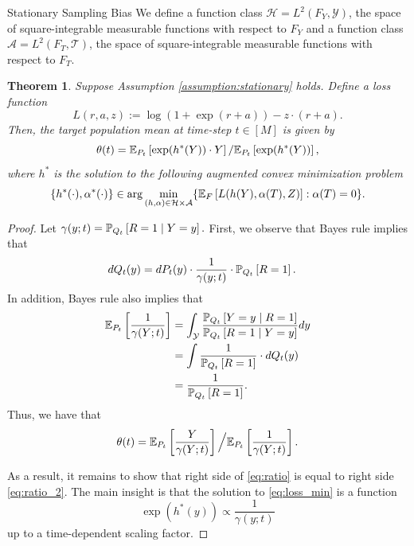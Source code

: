 \documentclass{article}
\theoremstyle{definition}
\theoremstyle{plain}
\newtheorem{theo}[prop]{Theorem}
\theoremstyle{remark}
\begin{document}
\begin{section}{Stationary Sampling Bias}
We define a function class $\mathcal{H} = L^{2}(F_{Y}, \mathcal{Y})$, the space of square-integrable measurable functions with respect to $F_{Y}$ and a function class $\mathcal{A} = L^{2}(F_{T}, \mathcal{T})$, the space of square-integrable measurable functions with respect to $F_{T}$.
\begin{theo}
Suppose Assumption \ref{assumption:stationary} holds. Define a loss function 
\begin{equation} L(r, a, z) := \log(1 + \exp(r+ a)) - z \cdot (r + a). \end{equation}
Then, the target population mean at time-step $t \in [M]$ is given by
\begin{equation}
\label{eq:ratio_2}
\theta(t) = \EE[P_{t}]{\exp(h^{*}(Y)) \cdot Y} / \EE[P_{t}]{\exp(h^{*}(Y))},
\end{equation}
where $h^{*}$ is the solution to the following augmented convex minimization problem
\begin{equation} 
\label{eq:loss_min}
\{h^{*}(\cdot), \alpha^{*}(\cdot)\} \in \arg\min_{(h, \alpha) \in \mathcal{H} \times \mathcal{A}} \{\EE[F]{L(h(Y), \alpha(T), Z)} : \alpha(T) = 0\}.\end{equation}
\end{theo}


\begin{proof}
Let $\gamma(y;t) = \PP[Q_{t}]{R=1 \mid Y=y}.$ First, we observe that Bayes rule implies that 
\begin{align*}
dQ_{t}(y) &= dP_{t}(y) \cdot \frac{1}{\gamma(y;t)} \cdot \PP[Q_{t}]{R=1}.
\end{align*}
In addition, Bayes rule also implies that
\begin{align*}
\EE[P_{t}]{\frac{1}{\gamma(Y;t)}} &= \int_{\mathcal{Y}} \frac{\PP[Q_{t}]{Y=y \mid R=1}}{\PP[Q_{t}]{R=1 \mid Y=y}} dy \\
&= \int \frac{1}{\PP[Q_{t}]{R=1}} \cdot dQ_{t}(y) \\
&= \frac{1}{\PP[Q_{t}]{R=1}}.
\end{align*}
Thus, we have that
\begin{equation} \label{eq:ratio} \theta(t) = \EE[P_{t}]{\frac{Y}{\gamma(Y;t)}} \Big/ \EE[P_{t}]{\frac{1}{\gamma(Y;t)}}. \end{equation}

As a result, it remains to show that right side of \eqref{eq:ratio} is equal to right side \eqref{eq:ratio_2}. The main insight is that the solution to \eqref{eq:loss_min} is a function 
\begin{equation} \label{eq:prop_density} \exp(h^{*}(y)) \propto \frac{1}{\gamma(y;t)} \end{equation}
up to a time-dependent scaling factor.


\end{proof}
\end{section}
\end{document}
